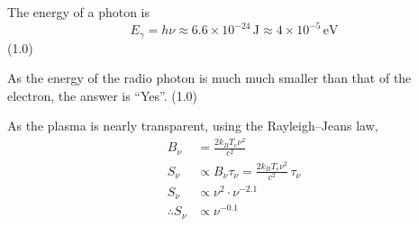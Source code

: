 \begin{description}
  The energy of a photon is
  \[
    E_\gamma = h\nu \approx 6.6\times10^{-24}\,\mathrm{J}
             \approx 4\times10^{-5}\,\mathrm{eV}
  \]
  \hfill(1.0)

  As the energy of the radio photon is much much smaller than that of the
  electron, the answer is ``Yes''. \hfill(1.0)
\item[(e)] As the plasma is nearly transparent, using the Rayleigh--Jeans law,
  \begin{align*}
    B_\nu &= \frac{2k_B T_e \nu^2}{c^2} \tag*{(1.0)}\\
    S_\nu &\propto B_\nu \tau_\nu = \frac{2k_B T_e \nu^2}{c^2}\,\tau_\nu\\
    S_\nu &\propto \nu^2\cdot\nu^{-2.1}\\
    \therefore S_\nu &\propto \nu^{-0.1} \tag*{(3.0)}
  \end{align*}
\end{description}

